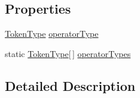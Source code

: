 \subsection*{Properties}
\begin{DoxyCompactItemize}
\item 
\hyperlink{a00040_a301aa7c866593a5b625a8fc158bbeace}{Token\-Type} \hyperlink{a00072_ac2de2f59be0e69b316627a4de16fadd3}{operator\-Type}
\item 
static \hyperlink{a00040_a301aa7c866593a5b625a8fc158bbeace}{Token\-Type}\mbox{[}$\,$\mbox{]} \hyperlink{a00072_a8dca7db3b76b8c358aba6068274e07df}{operator\-Types}
\end{DoxyCompactItemize}


\subsection{Detailed Description}


